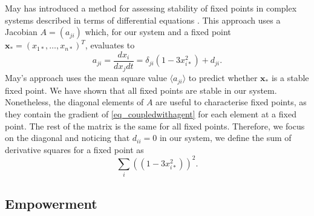 \documentclass[conference]{IEEEtran}
\newcommand{\vectorsym}[1]{\ensuremath{\mathbf{#1}}}
\newcommand{\ccrit}{\ensuremath{c_{\mathrm{crit}}}}
\newcommand{\agentimpact}{\ensuremath{e}}
\begin{document}
May has introduced a method for assessing stability of fixed points in
complex systems described in terms of differential equations
\cite{May1972_stablelargecomplexsystem}. This approach uses a Jacobian
$A = (a_{ji})$ which, for our system and a fixed point
$\vectorsym{x}_* = (x_{1*}, \ldots, x_{n*})^T$, evaluates to
\begin{equation}
  a_{ji} = \frac{d x_i}{d x_j d t} = \delta_{ji} (1 - 3 x_{i*}^2) + d_{ji}.
\end{equation}
May's approach uses the mean square value $\langle a_{ji} \rangle$ to
predict whether $\vectorsym{x}_*$ is a stable fixed point. We have
shown that all fixed points are stable in our system. Nonetheless, the
diagonal elements of $A$ are useful to characterise fixed points, as
they contain the gradient of \ref{eq_coupledwithagent} for each
element at a fixed point. The rest of the matrix is the same for all
fixed points. Therefore, we focus on the diagonal and noticing that
$d_{ii} = 0$ in our system, we define the sum of derivative squares
for a fixed point as
\begin{equation}
  \label{eq_dss}
  \sum_i ((1 - 3 x_{i*}^2))^2.
\end{equation}



\subsection{Empowerment}




\end{document}
